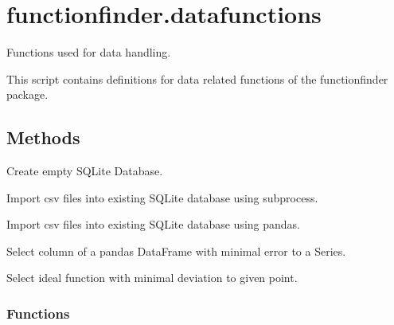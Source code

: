 \documentclass[letterpaper,10pt,english]{sphinxmanual}
\begin{document}
\sphinxstepscope


\section{functionfinder.datafunctions}
\label{\detokenize{_autosummary/functionfinder.datafunctions:module-functionfinder.datafunctions}}\label{\detokenize{_autosummary/functionfinder.datafunctions:functionfinder-datafunctions}}\label{\detokenize{_autosummary/functionfinder.datafunctions::doc}}
\sphinxAtStartPar
Functions used for data handling.

\sphinxAtStartPar
This script contains definitions for data related functions of the
functionfinder package.


\subsection{Methods}
\label{\detokenize{_autosummary/functionfinder.datafunctions:methods}}\begin{description}
\sphinxAtStartPar
Create empty SQLite Database.

\sphinxAtStartPar
Import csv files into existing SQLite database using subprocess.

\sphinxAtStartPar
Import csv files into existing SQLite database using pandas.

\sphinxAtStartPar
Select column of a pandas DataFrame with minimal error to a Series.

\sphinxAtStartPar
Select ideal function with minimal deviation to given point.

\end{description}
\subsubsection*{Functions}
\end{document}
